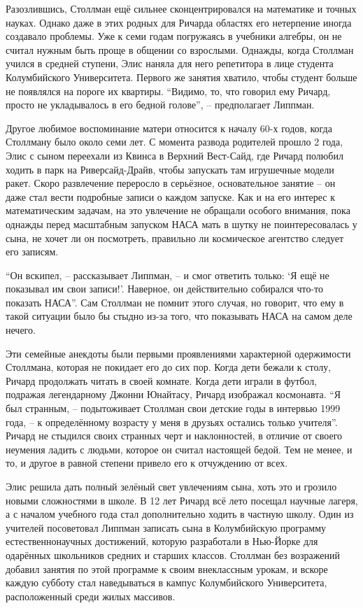 Разозлившись, Столлман ещё сильнее сконцентрировался на математике и точных науках. Однако даже в этих родных для Ричарда областях его нетерпение иногда создавало проблемы. Уже к семи годам погружаясь в учебники алгебры, он не считал нужным быть проще в общении со взрослыми. Однажды, когда Столлман учился в средней ступени, Элис наняла для него репетитора в лице студента Колумбийского Университета. Первого же занятия хватило, чтобы студент больше не появлялся на пороге их квартиры. \enquote{Видимо, то, что говорил ему Ричард, просто не укладывалось в его бедной голове}, -- предполагает Липпман.

Другое любимое воспоминание матери относится к началу 60-х годов, когда Столлману было около семи лет. С момента развода родителей прошло 2 года, Элис с сыном переехали из Квинса в Верхний Вест-Сайд, где Ричард полюбил ходить в парк на Риверсайд-Драйв, чтобы запускать там игрушечные модели ракет. Скоро развлечение переросло в серьёзное, основательное занятие -- он даже стал вести подробные записи о каждом запуске. Как и на его интерес к математическим задачам, на это увлечение не обращали особого внимания, пока однажды перед масштабным запуском НАСА мать в шутку не поинтересовалась у сына, не хочет ли он посмотреть, правильно ли космическое агентство следует его записям.

\enquote{Он вскипел, -- рассказывает Липпман, -- и смог ответить только: \enquote{Я ещё не показывал им свои записи!}. Наверное, он действительно собирался что-то показать НАСА}. Сам Столлман не помнит этого случая, но говорит, что ему в такой ситуации было бы стыдно из-за того, что показывать НАСА на самом деле нечего.

Эти семейные анекдоты были первыми проявлениями характерной одержимости Столлмана, которая не покидает его до сих пор. Когда дети бежали к столу, Ричард продолжать читать в своей комнате. Когда дети играли в футбол, подражая легендарному Джонни Юнайтасу, Ричард изображал космонавта. \enquote{Я был странным, -- подытоживает Столлман свои детские годы в интервью 1999 года, -- к определённому возрасту у меня в друзьях остались только учителя}. Ричард не стыдился своих странных черт и наклонностей, в отличие от своего неумения ладить с людьми, которое он считал настоящей бедой. Тем не менее, и то, и другое в равной степени привело его к отчуждению от всех.

Элис решила дать полный зелёный свет увлечениям сына, хоть это и грозило новыми сложностями в школе. В 12 лет Ричард всё лето посещал научные лагеря, а с началом учебного года стал дополнительно ходить в частную школу. Один из учителей посоветовал Липпман записать сына в Колумбийскую программу естественнонаучных достижений, которую разработали в Нью-Йорке для одарённых школьников средних и старших классов. Столлман без возражений добавил занятия по этой программе к своим внеклассным урокам, и вскоре каждую субботу стал наведываться в кампус Колумбийского Университета, расположенный среди жилых массивов.

